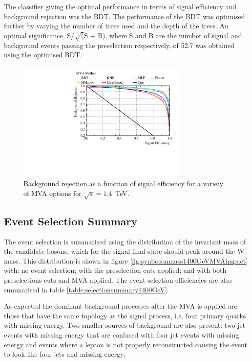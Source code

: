 The classifier giving the optimal performance in terms of signal efficiency and background rejection was the BDT.  The performance of the BDT was optimised further by varying the number of trees used and the depth of the trees.  An optimal significance, S/$\sqrt(\text{S + B})$, where S and B are the number of signal and background events passing the preselection respectively, of 52.7 was obtained using the optimised BDT. 

\begin{figure}
\centering
\includegraphics[width=0.75\textwidth]{PhysicsAnalysis/Plots/MVAPlots/1400GeV/ThesisPlotMVAAlternatives1400GeV.pdf}
\caption[Background rejection as a function of signal efficiency for a variety of MVA options for $\sqrt{s}=1.4$~TeV.]{Background rejection as a function of signal efficiency for a variety of MVA options for $\sqrt{s}=1.4$~TeV.} 
\label{fig:mvaalternatives1400GeV}
\end{figure}


\subsection{Event Selection Summary}
\label{sec:eventselsummary1400GeV}
The event selection is summarised using the distribution of the invariant mass of the candidate bosons, which for the signal final state should peak around the W mass.  This distribution is shown in figure \ref{fig:synbosonmass1400GeVMVAimpact} with: no event selection; with the preselection cuts applied; and with both preselections cuts and MVA applied.  The event selection efficiencies are also summarised in table \ref{table:selectionsummary1400GeV}.

As expected the dominant background processes after the MVA is applied are those that have the same topology as the signal process, i.e. four primary quarks with missing energy.  Two smaller sources of background are also present: two jet events with missing energy that are confused with four jet events with missing energy and events where a lepton is not properly reconstructed causing the event to look like four jets and missing energy.  

